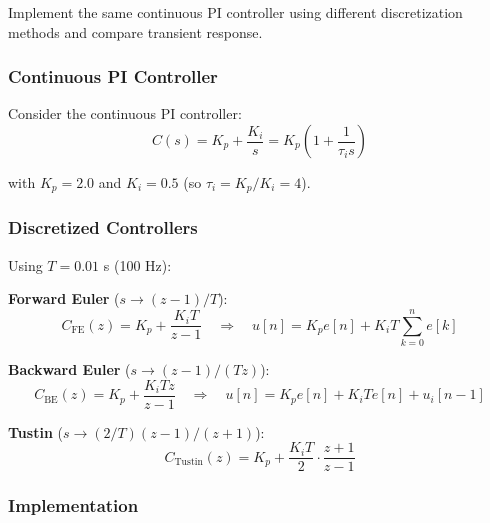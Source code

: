 Implement the same continuous PI controller using different discretization methods and compare transient response.

\subsubsection{Continuous PI Controller}

Consider the continuous PI controller:
\begin{equation}
C(s) = K_p + \frac{K_i}{s} = K_p \left(1 + \frac{1}{\tau_i s}\right)
\label{eq:lab_pi_continuous}
\end{equation}

with $K_p = 2.0$ and $K_i = 0.5$ (so $\tau_i = K_p/K_i = 4$).

\subsubsection{Discretized Controllers}

Using $T = 0.01$ s (100 Hz):

\textbf{Forward Euler} ($s \rightarrow (z-1)/T$):
\begin{equation}
C_{\text{FE}}(z) = K_p + \frac{K_i T}{z - 1} \quad \Rightarrow \quad u[n] = K_p e[n] + K_i T \sum_{k=0}^{n} e[k]
\end{equation}

\textbf{Backward Euler} ($s \rightarrow (z-1)/(Tz)$):
\begin{equation}
C_{\text{BE}}(z) = K_p + \frac{K_i T z}{z - 1} \quad \Rightarrow \quad u[n] = K_p e[n] + K_i T e[n] + u_i[n-1]
\end{equation}

\textbf{Tustin} ($s \rightarrow (2/T)(z-1)/(z+1)$):
\begin{equation}
C_{\text{Tustin}}(z) = K_p + \frac{K_i T}{2} \cdot \frac{z + 1}{z - 1}
\end{equation}

\subsubsection{Implementation}

